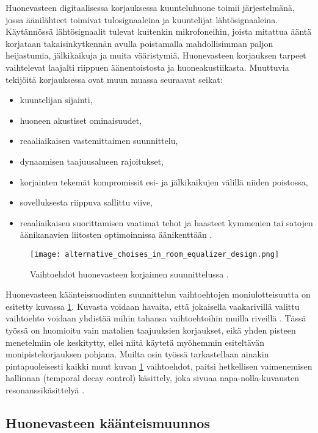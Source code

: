 \documentclass[finnish,12pt]{article}
\begin{document}
Huonevasteen digitaalisessa korjauksessa kuunteluhuone toimii järjestelmänä, jossa äänilähteet toimivat tulosignaaleina ja kuuntelijat lähtösignaaleina. Käytännössä lähtösignaalit tulevat kuitenkin mikrofoneihin, joista mitattua ääntä korjataan takaisinkytkennän avulla poistamalla mahdollisimman paljon heijastumia, jälkikaikuja ja muita vääristymiä. Huonevasteen korjauksen tarpeet vaihtelevat laajalti riippuen äänentoistosta ja huoneakustiikasta. Muuttuvia tekijöitä korjauksessa ovat muun muassa seuraavat seikat: \begin{itemize}
\item kuuntelijan sijainti,
\item huoneen akustiset ominaisuudet,
\item reaaliaikaisen vastemittaimen suunnittelu,
\item dynaamisen taajuusalueen rajoitukset,
\item korjainten tekemät kompromissit esi- ja jälkikaikujen välillä niiden poistossa,
\item sovelluksesta riippuva sallittu viive,
\item reaaliaikaisen suorittamisen vaatimat tehot ja haasteet kymmenien tai satojen äänikanavien liitosten optimoinnissa äänikenttään \cite{MKarjalainen2005}.
\end{itemize}

\begin{figure}[h!]
	\centering
	\texttt{[image: alternative\_choises\_in\_room\_equalizer\_design.png]}
	\caption{Vaihtoehdot huonevasteen korjaimen suunnittelussa \cite{MKarjalainen2005}.}
	\label{fig:alternatives}
\end{figure}

Huonevasteen käänteissuodinten suunnittelun vaihtoehtojen moniulotteisuutta on esitetty kuvassa \ref{fig:alternatives}. Kuvasta voidaan havaita, että jokaisella vaakarivillä valittu vaihtoehto voidaan yhdistää mihin tahansa vaihtoehtoihin muilla riveillä \cite{MKarjalainen2005}. Tässä työssä on huomioitu vain matalien taajuuksien korjaukset, eikä yhden pisteen menetelmiin ole keskitytty, ellei niitä käytetä myöhemmin esiteltävän monipistekorjauksen pohjana. Muilta osin työssä tarkastellaan ainakin pintapuoleisesti kaikki muut kuvan \ref{fig:alternatives} vaihtoehdot, paitsi hetkellisen vaimenemisen hallinnan (temporal decay control) käsittely, joka sivuaa napa-nolla-kuvausten resonanssikäsittelyä \cite{Antsalo2004}.

\subsection{Huonevasteen käänteismuunnos}
\end{document}
